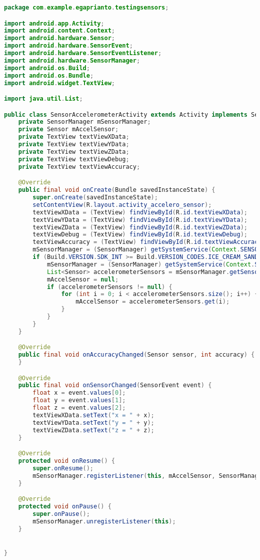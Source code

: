 \begin{lstlisting}[language=Java,basicstyle=\tiny,caption=SensorAccelerometerActivity.java]
package com.example.egaprianto.testingsensors;

import android.app.Activity;
import android.content.Context;
import android.hardware.Sensor;
import android.hardware.SensorEvent;
import android.hardware.SensorEventListener;
import android.hardware.SensorManager;
import android.os.Build;
import android.os.Bundle;
import android.widget.TextView;

import java.util.List;

public class SensorAccelerometerActivity extends Activity implements SensorEventListener {
    private SensorManager mSensorManager;
    private Sensor mAccelSensor;
    private TextView textViewXData;
    private TextView textViewYData;
    private TextView textViewZData;
    private TextView textViewDebug;
    private TextView textViewAccuracy;

    @Override
    public final void onCreate(Bundle savedInstanceState) {
        super.onCreate(savedInstanceState);
        setContentView(R.layout.activity_accelero_sensor);
        textViewXData = (TextView) findViewById(R.id.textViewXData);
        textViewYData = (TextView) findViewById(R.id.textViewYData);
        textViewZData = (TextView) findViewById(R.id.textViewZData);
        textViewDebug = (TextView) findViewById(R.id.textViewDebug);
        textViewAccuracy = (TextView) findViewById(R.id.textViewAccuracy);
        mSensorManager = (SensorManager) getSystemService(Context.SENSOR_SERVICE);
        if (Build.VERSION.SDK_INT >= Build.VERSION_CODES.ICE_CREAM_SANDWICH_MR1) {
            mSensorManager = (SensorManager) getSystemService(Context.SENSOR_SERVICE);
            List<Sensor> accelerometerSensors = mSensorManager.getSensorList(Sensor.TYPE_ACCELEROMETER);
            mAccelSensor = null;
            if (accelerometerSensors != null) {
                for (int i = 0; i < accelerometerSensors.size(); i++) {
                    mAccelSensor = accelerometerSensors.get(i);
                }
            }
        }
    }

    @Override
    public final void onAccuracyChanged(Sensor sensor, int accuracy) {
    }

    @Override
    public final void onSensorChanged(SensorEvent event) {
        float x = event.values[0];
        float y = event.values[1];
        float z = event.values[2];
        textViewXData.setText("x = " + x);
        textViewYData.setText("y = " + y);
        textViewZData.setText("z = " + z);
    }

    @Override
    protected void onResume() {
        super.onResume();
        mSensorManager.registerListener(this, mAccelSensor, SensorManager.SENSOR_DELAY_NORMAL);
    }

    @Override
    protected void onPause() {
        super.onPause();
        mSensorManager.unregisterListener(this);
    }


}
\end{lstlisting}
